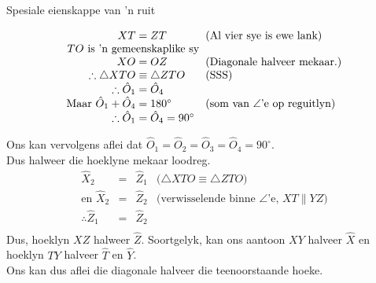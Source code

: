 \begin{wex}{Spesiale eienskappe van 'n ruit}
{
\begin{equation*}
 \begin{array}{r@{\;}l@{\quad}l}
XT &= ZT & \mbox{(Al vier sye is ewe lank)} \\
 \multicolumn{2}{c}{TO\mbox{ is 'n gemeenskaplike sy}} & \\ 
XO &= OZ & \mbox{(Diagonale halveer mekaar.)} \\ 
\therefore \triangle XTO &\equiv \triangle ZTO & \mbox{(SSS)} \\
\therefore \hat{O}_1 &= \hat{O}_4 & \\
\mbox{Maar }\hat{O}_1 + \hat{O}_4 &= 180^\circ & \mbox{(som van $\angle$'e op reguitlyn)} \\
\therefore \hat{O}_1 &= \hat{O}_4 = 90^\circ & 
 \end{array}

\end{equation*}


Ons kan vervolgens aflei dat $\hat{O}_1 = \hat{O}_2 = \hat{O}_3 = \hat{O}_4 = 90^\circ$. \\
Dus halweer die hoeklyne mekaar loodreg.
\begin{equation*}
 \begin{array}{rcll}
 \hat{X}_2 &=& \hat{Z}_1 & \mbox{($\triangle XTO \equiv \triangle ZTO$)} \\
\mbox{en }\hat{X}_2 &=& \hat{Z}_2 & \mbox{(verwisselende binne $\angle$'e, $XT \parallel YZ$)} \\
\therefore \hat{Z}_1 &=& \hat{Z}_2 & \\
 \end{array}

\end{equation*}
Dus, hoeklyn $XZ$ halweer $\hat{Z}$. 
Soortgelyk, kan ons aantoon $XY$ halveer $\hat{X}$
en hoeklyn $TY$ halveer $\hat{T}$ en $\hat{Y}$. \\ 
Ons kan dus aflei die diagonale halveer die teenoorstaande hoeke.
}
\end{wex}

